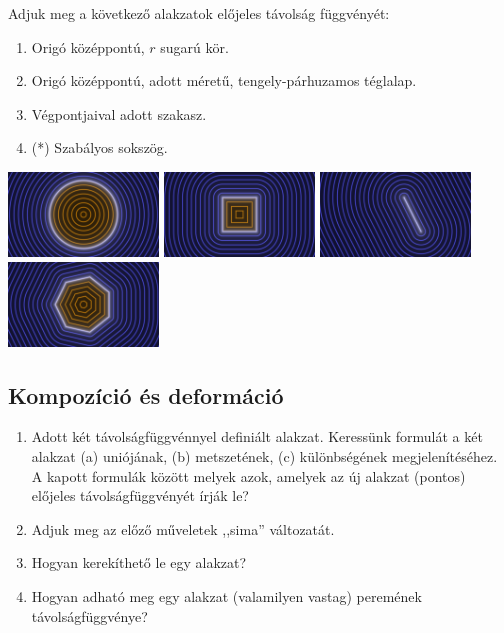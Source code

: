 \matfeladatok


Adjuk meg a következő alakzatok előjeles távolság függvényét:

\begin{enumerate}[resume]
  \item Origó középpontú, $r$ sugarú kör.
  \item Origó középpontú, adott méretű, tengely-párhuzamos téglalap.
  \item Végpontjaival adott szakasz.
  \item (*) Szabályos sokszög.
\end{enumerate}

\includegraphics[width=4cm]{images/sdCircle.png}
\includegraphics[width=4cm]{images/sdSquare.png}
\includegraphics[width=4cm]{images/sdSegment.png}
\includegraphics[width=4cm]{images/sdNgon.png}


\subsection{Kompozíció és deformáció}

\matfeladatok

\begin{enumerate}[resume]

\item Adott két távolságfüggvénnyel definiált alakzat. Keressünk formulát a
két alakzat
(a) uniójának,
(b) metszetének,
(c) különbségének megjelenítéséhez. A kapott formulák között melyek azok, amelyek
az új alakzat (pontos) előjeles távolságfüggvényét írják le?

\item Adjuk meg az előző műveletek ,,sima'' változatát.

\item Hogyan kerekíthető le egy alakzat?

\item Hogyan adható meg egy alakzat (valamilyen vastag) peremének távolságfüggvénye?
\end{enumerate}


